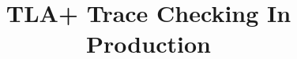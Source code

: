 \documentclass{vldb}
\begin{document}

\title{TLA+ Trace Checking In Production}



%
%
%
%

\end{document}
